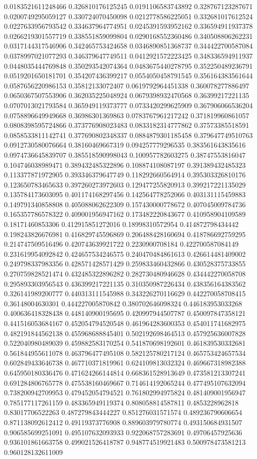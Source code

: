 \begin{table}
\begin{tabu}
\begin{sparkline}{10}
0.0183521611248466 0.326810176125245 0.0191106583743892 0.328767123287671 0.0200749295059127 0.330724070450098 0.0212778586225051 0.332681017612524 0.0227633956793542 0.334637964774951 0.0245391593952162 0.336594911937378 0.0266219301557719 0.338551859099804 0.0290168552360486 0.340508806262231 0.0317144317546906 0.342465753424658 0.0346890851368737 0.344422700587084 0.0378997021077293 0.346379647749511 0.0412921572223425 0.348336594911937 0.0448035444769848 0.350293542074364 0.0483675440278795 0.352250489236791 0.0519201650181701 0.354207436399217 0.0554050458791545 0.356164383561644 0.0587656220986153 0.35812133072407 0.0619792964451338 0.360078277886497 0.0650367507553906 0.362035225048924 0.0679398932470568 0.36399217221135 0.0707013021793584 0.365949119373777 0.0733420299625909 0.367906066536204 0.0758896649949668 0.36986301369863 0.0783767961217242 0.371819960861057 0.0808398595724866 0.373776908023483 0.0833182314777862 0.37573385518591 0.0858533811142741 0.377690802348337 0.0884879301185458 0.379647749510763 0.0912730580076664 0.38160469667319 0.094257779296535 0.383561643835616 0.0974736645839707 0.385518590998043 0.100957782603275 0.38747553816047 0.104746038989471 0.389432485322896 0.108874108087197 0.391389432485323 0.113377871972905 0.393346379647749 0.118292660564914 0.395303326810176 0.123650783465633 0.397260273972603 0.129477255820913 0.399217221135029 0.135784173603095 0.401174168297456 0.142564778252066 0.403131115459883 0.149791340858808 0.405088062622309 0.157430000778672 0.407045009784736 0.165357786578322 0.409001956947162 0.173482220843677 0.410958904109589 0.18171460853306 0.412915851272016 0.18998310572954 0.414872798434442 0.198243826676981 0.416829745596869 0.206488428160694 0.418786692759295 0.214747509516496 0.420743639921722 0.2230900708184 0.422700587084149 0.231619954092842 0.424657534246575 0.240470484861613 0.426614481409002 0.249798337983356 0.428571428571429 0.259833460432866 0.430528375733855 0.270759828521474 0.432485322896282 0.282730480946628 0.434442270058708 0.295893303956543 0.436399217221135 0.310350987226434 0.438356164383562 0.326141989200777 0.440313111545988 0.343226270116629 0.442270058708415 0.36148004630301 0.444227005870842 0.380702646098324 0.446183953033268 0.400636418328438 0.448140900195695 0.420997944507787 0.450097847358121 0.441516053684167 0.452054794520548 0.461964283600353 0.454011741682975 0.482191844562138 0.455968688845401 0.502192698464513 0.457925636007828 0.522040980489039 0.459882583170254 0.541870698192601 0.461839530332681 0.561844955611078 0.463796477495108 0.582125780217124 0.465753424657534 0.602849433646738 0.467710371819961 0.624109813032324 0.469667318982388 0.645950180336476 0.471624266144814 0.668361528913649 0.473581213307241 0.691284806765778 0.475538160469667 0.714614192065244 0.477495107632094 0.738200942709953 0.479452054794521 0.761802994975824 0.481409001956947 0.785177117261159 0.483365949119374 0.808058814587811 0.4853228962818 0.83017706522263 0.487279843444227 0.851276031571574 0.489236790606654 0.871138092612412 0.49119373776908 0.889603979780774 0.493150684931507 0.906585699251091 0.495107632093933 0.922068757283691 0.49706457925636 0.936101861663758 0.499021526418787 0.948774519921483 0.500978473581213 0.960128132611009 
\end{sparkline}
\end{tabu}
\end{table}
